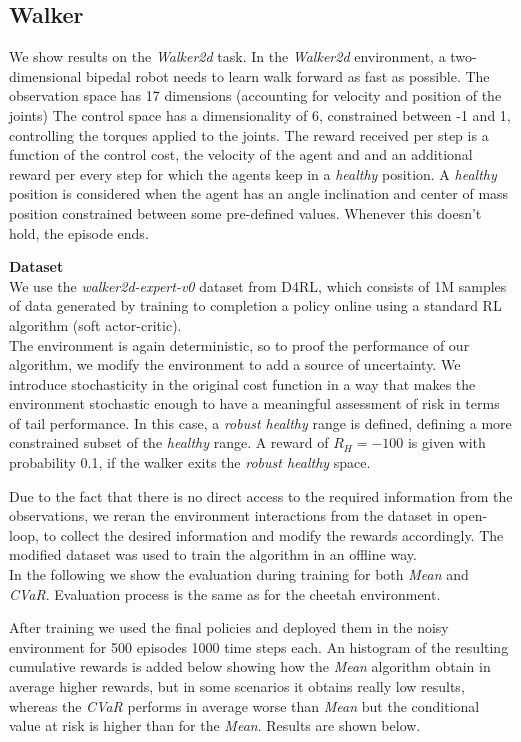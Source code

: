 \clearpage

\subsection{Walker}

We show results on the \textit{Walker2d} task.
In the \textit{Walker2d} environment, a two-dimensional bipedal robot needs to learn walk forward
as fast as possible.
The observation space has 17 dimensions (accounting for velocity and position of the joints)
The control space has a dimensionality of 6, constrained between -1 and 1, 
controlling the torques applied to the joints.
The reward received per step is a function of the control cost, the velocity of the agent and 
and an additional reward per every step for which the agents keep in a \textit{healthy} position.
A \textit{healthy} position is considered when the agent has an angle inclination and center of mass
position constrained between some pre-defined values. Whenever this doesn't hold, the episode ends.

\textbf{Dataset}\\
We use the \textit{walker2d-expert-v0} dataset from D4RL, which consists of 1M samples of data generated by
training to completion a policy online using a standard RL algorithm (soft actor-critic).\\
The environment is again deterministic, so to proof the performance of our algorithm, we modify the environment to
add a source of uncertainty. We introduce stochasticity in the original cost function in a way that 
makes the environment stochastic enough to have a meaningful assessment of risk in terms of 
tail performance.
In this case, a \textit{robust healthy} range is defined, defining a more constrained subset of the \textit{healthy} range.
A reward of $R_H=-100$ is given with probability 0.1, if the walker exits the \textit{robust healthy} space.

Due to the fact that there is no direct access to the required information from the observations,
we reran the environment interactions from the dataset in open-loop, to collect the desired information and 
modify the rewards accordingly.
The modified dataset was used to train the algorithm in an offline way.\\


In the following we show the evaluation during training for both \textit{Mean} and
\textit{CVaR}.
Evaluation process is the same as for the cheetah environment.

After training we used the final policies and deployed them in the noisy environment for 500 episodes 
1000 time steps each. An histogram of the resulting cumulative rewards is added below showing
how the \textit{Mean} algorithm obtain in average higher rewards, but in some scenarios it 
obtains really low results, whereas the \textit{CVaR} performs in average worse than \textit{Mean} 
but the conditional value at risk is higher than for the \textit{Mean}.
Results are shown below.

